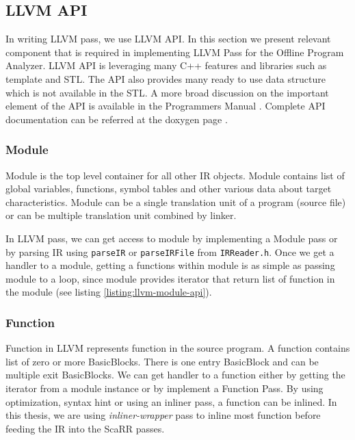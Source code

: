 \subsection{LLVM API}

In writing LLVM pass, we use LLVM API. In this section we present relevant
component that is required in implementing LLVM Pass for the Offline Program
Analyzer. LLVM API is leveraging many C++ features and libraries such as
template and STL. The API also provides many ready to use data structure which
is not available in the STL. A more broad discussion on the important element of
the API is available in the Programmers Manual \cite{LLVMProgrammerManuala}.
Complete API documentation can be referred at the doxygen page \cite{LLVMLLVMa}.

\subsubsection{Module}

Module is the top level container for all other IR objects. Module contains list
of global variables, functions, symbol tables and other various data about
target characteristics. Module can be a single translation unit of a program
(source file) or can be multiple translation unit combined by linker. 

In LLVM pass, we can get access to module by implementing a Module pass or by
parsing IR using \texttt{parseIR} or \texttt{parseIRFile} from
\texttt{IRReader.h}. Once we get a handler to a module, getting a functions
within module is as simple as passing module to a loop, since module provides
iterator that return list of function in the module (see listing
\ref{listing:llvm-module-api}).


\subsubsection{Function}

Function in LLVM represents function in the source program. A function contains
list of zero or more BasicBlocks. There is one entry BasicBlock and can be
multiple exit BasicBlocks. We can get handler to a function either by getting
the iterator from a module instance or by implement a Function Pass. By using
optimization, syntax hint or using an inliner pass, a function can be inlined.
In this thesis, we are using \emph{inliner-wrapper} pass to inline most function
before feeding the IR into the ScaRR passes.

